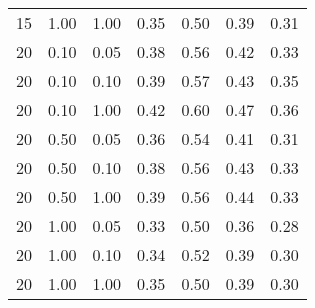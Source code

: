 \begin{tabular}{lllcccc}
15 & 1.00 & 1.00 & 0.35 & 0.50 & 0.39 & 0.31 \\ 
20 & 0.10 & 0.05 & 0.38 & 0.56 & 0.42 & 0.33 \\ 
20 & 0.10 & 0.10 & 0.39 & 0.57 & 0.43 & 0.35 \\ 
20 & 0.10 & 1.00 & 0.42 & 0.60 & 0.47 & 0.36 \\ 
20 & 0.50 & 0.05 & 0.36 & 0.54 & 0.41 & 0.31 \\ 
20 & 0.50 & 0.10 & 0.38 & 0.56 & 0.43 & 0.33 \\ 
20 & 0.50 & 1.00 & 0.39 & 0.56 & 0.44 & 0.33 \\ 
20 & 1.00 & 0.05 & 0.33 & 0.50 & 0.36 & 0.28 \\ 
20 & 1.00 & 0.10 & 0.34 & 0.52 & 0.39 & 0.30 \\ 
20 & 1.00 & 1.00 & 0.35 & 0.50 & 0.39 & 0.30 \\ 
\end{tabular} 
